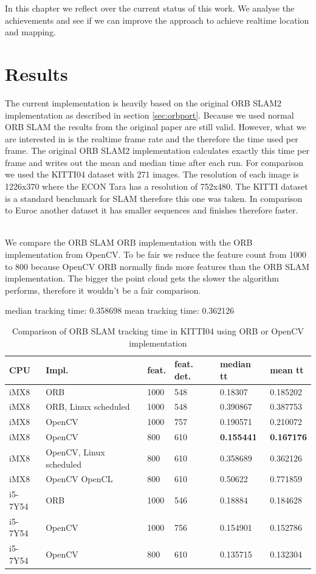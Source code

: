 \documentclass[11pt,a4paper,titlepage,oneside]{report}
\begin{document}
In this chapter we reflect over the current status of this work. We analyse the achievements and see if we can improve the approach to achieve realtime location and mapping.

\section{Results}

The current implementation is heavily based on the original ORB SLAM2 implementation as described in section \ref{sec:orbport}. Because we used normal ORB SLAM the results from the original paper are still valid. However, what we are interested in is the realtime frame rate and the therefore the time used per frame. The original ORB SLAM2 implementation calculates exactly this time per frame and writes out the mean and median time after each run. For comparison we used the KITTI04 dataset with 271 images. The resolution of each image is 1226x370 where the ECON Tara has a resolution of 752x480. The KITTI dataset is a standard benchmark for SLAM therefore this one was taken. In comparison to Euroc another dataset it has smaller sequences and finishes therefore faster.\\\

We compare the ORB SLAM ORB implementation with the ORB implementation from OpenCV. To be fair we reduce the feature count from 1000 to 800 because OpenCV ORB normally finds more features than the ORB SLAM implementation. The bigger the point cloud gets the slower the algorithm performs, therefore it wouldn't be a fair comparison.

median tracking time: 0.358698
mean tracking time: 0.362126


\begin{table}
	\begin{tabular}{  | l | l | l | l | l | l | }
		\hline
		\textbf{CPU} & \textbf{Impl.} & \textbf{feat.} & \textbf{feat. det.} & \textbf{median tt} & \textbf{mean tt} \\ \hline
		iMX8 & ORB & 1000 &  548 & 0.18307 & 0.185202 \\ \hline
		iMX8 & ORB, Linux scheduled & 1000 & 548 & 0.390867 & 0.387753 \\ \hline
		iMX8 & OpenCV & 1000 & 757 & 0.190571 & 0.210072 \\ \hline
		iMX8 & OpenCV & 800 & 610 & \textbf{0.155441} & \textbf{0.167176} \\ \hline
		iMX8 & OpenCV, Linux scheduled & 800 & 610 & 0.358689 & 0.362126 \\ \hline
		iMX8 & OpenCV OpenCL & 800 & 610 & 0.50622 & 0.771859 \\ \hline
		i5-7Y54 & ORB & 1000 & 546 & 0.18884 & 0.184628 \\ \hline
		i5-7Y54 & OpenCV & 1000 & 756 & 0.154901 & 0.152786 \\ \hline
		i5-7Y54 & OpenCV & 800 & 610 & 0.135715 & 0.132304 \\ \hline
	\end{tabular}
	\caption{Comparison of ORB SLAM tracking time in KITTI04 using ORB or OpenCV implementation}
  \label{tab:result}
\end{table}
\end{document}

